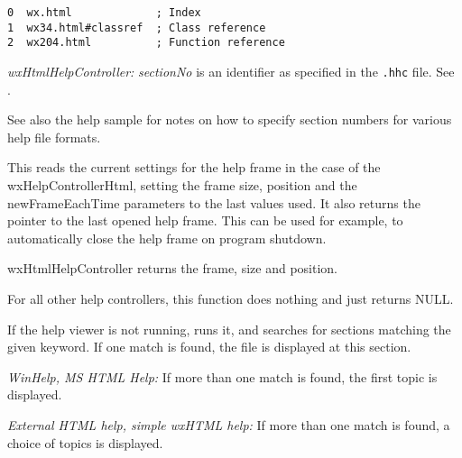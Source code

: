 \begin{verbatim}
0  wx.html             ; Index
1  wx34.html#classref  ; Class reference
2  wx204.html          ; Function reference
\end{verbatim}

{\it wxHtmlHelpController:} {\it sectionNo} is an identifier as specified in the {\tt .hhc} file. See .

See also the help sample for notes on how to specify section numbers for various help file formats.

\label{wxhelpcontrollergetframeparameters}


This reads the current settings for the help frame in the case of the
wxHelpControllerHtml, setting the frame size, position and
the newFrameEachTime parameters to the last values used. It also
returns the pointer to the last opened help frame. This can be used
for example, to automatically close the help frame on program
shutdown.

wxHtmlHelpController returns the frame,
size and position.

For all other help controllers, this function does nothing
and just returns NULL.




\label{wxhelpcontrollerkeywordsearch}


If the help viewer is not running, runs it, and searches for sections matching the given keyword. If one
match is found, the file is displayed at this section.

{\it WinHelp, MS HTML Help:} If more than one match is found, 
the first topic is displayed.

{\it External HTML help, simple wxHTML help:} If more than one match is found, 
a choice of topics is displayed.

